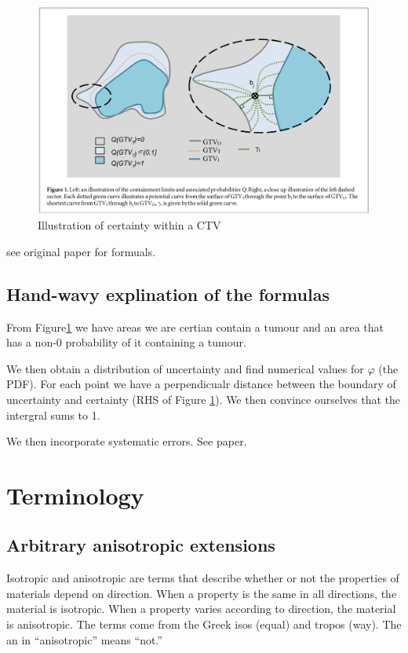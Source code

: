 \documentclass[11pt]{article}
\begin{document}
\begin{figure}[H]
    \centering
    \includegraphics[width=\textwidth]{images/PDF-of-CTV.png}
    \caption{Illustration of certainty within a CTV}
    \label{fig:pdf-of-ctv}
\end{figure}

see original paper for formuals.

\subsection{Hand-wavy explination of the formulas}

From Figure\ref{fig:pdf-of-ctv} we have areas we are certian contain a tumour and an area that has a non-0 probability of it containing a tumour. 

We then obtain a distribution of uncertainty and find numerical values for $\varphi$ (the PDF). For each point we have a perpendicualr distance between the boundary of uncertainty and certainty (RHS of Figure \ref{fig:pdf-of-ctv}). We then convince ourselves that the intergral sums to 1.

We then incorporate systematic errors. See paper.

\section{Terminology}

\subsection{Arbitrary anisotropic extensions} \label{term:arbitrary-anisotropic-extensions}

Isotropic and anisotropic are terms that describe whether or not the properties of materials depend on direction. When a property is the same in all directions, the material is isotropic. When a property varies according to direction, the material is anisotropic. The terms come from the Greek isos (equal) and tropos (way). The an in “anisotropic” means “not.”~\cite{anisotropy}
\end{document}
